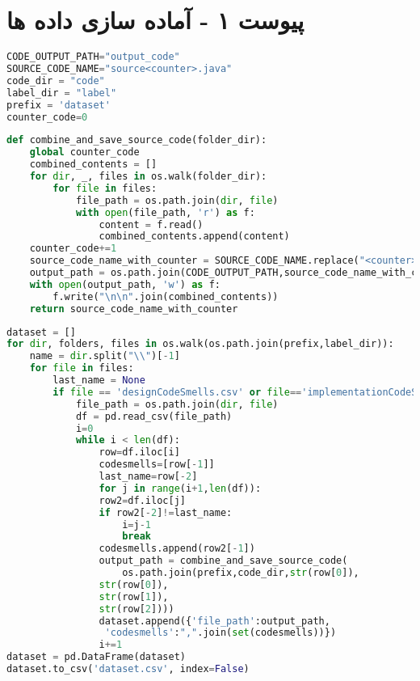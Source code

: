 \chapter*{پیوست ۱ - آماده سازی داده ها}

\begin{latin}
	\begin{lstlisting}[language=Python, title=\rl{ثابت ها}]
CODE_OUTPUT_PATH="output_code"
SOURCE_CODE_NAME="source<counter>.java"
code_dir = "code"
label_dir = "label"
prefix = 'dataset'
counter_code=0
\end{lstlisting}
\end{latin}
\begin{latin}
	\begin{lstlisting}[language=Python, title=\rl{تابع ترکیب کردن کد های پروژه جاوا}]
def combine_and_save_source_code(folder_dir):
	global counter_code
	combined_contents = []
	for dir, _, files in os.walk(folder_dir):
		for file in files:
			file_path = os.path.join(dir, file)
			with open(file_path, 'r') as f:
				content = f.read()
				combined_contents.append(content)
	counter_code+=1
	source_code_name_with_counter = SOURCE_CODE_NAME.replace("<counter>",str(counter_code))
	output_path = os.path.join(CODE_OUTPUT_PATH,source_code_name_with_counter)
	with open(output_path, 'w') as f:
		f.write("\n\n".join(combined_contents))
	return source_code_name_with_counter
\end{lstlisting}
\end{latin}

\begin{latin}
	\begin{lstlisting}[language=Python, title=\rl{گردهم آوردن لیبل ها به صورت یکجا برای آموزش}]
dataset = []
for dir, folders, files in os.walk(os.path.join(prefix,label_dir)):
	name = dir.split("\\")[-1]
	for file in files:
		last_name = None
		if file == 'designCodeSmells.csv' or file=='implementationCodeSmells.csv':
			file_path = os.path.join(dir, file)
			df = pd.read_csv(file_path)
			i=0
			while i < len(df):
				row=df.iloc[i]
				codesmells=[row[-1]]
				last_name=row[-2]
				for j in range(i+1,len(df)):
				row2=df.iloc[j]
				if row2[-2]!=last_name:
					i=j-1
					break
				codesmells.append(row2[-1])
				output_path = combine_and_save_source_code(
					os.path.join(prefix,code_dir,str(row[0]),
				str(row[0]),
				str(row[1]),
				str(row[2])))
				dataset.append({'file_path':output_path,
				 'codesmells':",".join(set(codesmells))})
				i+=1
dataset = pd.DataFrame(dataset)
dataset.to_csv('dataset.csv', index=False)
	\end{lstlisting}
\end{latin}


\clearpage